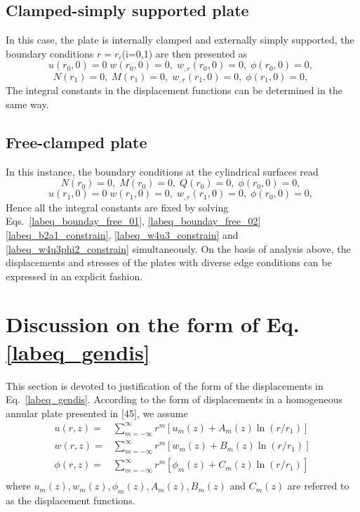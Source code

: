 \documentclass[12pt,sort&compress,fleqn,3p]{elsarticle}
\newcommand{\qiuhe}{ \sum ^{\infty}_{m=-\infty}}
\newcommand{\jiaobiao}[2]{ {#1} _ {#2} }
\begin{document}
\subsection{Clamped-simply supported plate}
In this case, the plate is internally clamped and externally simply supported, the boundary conditions $r=r_i$(i=0,1) are then presented as
\begin{equation}\label{labeq_bounday_clasim_01}
u(r_0,0)=0\; w(r_0,0)=0, \;w_{,r}(r_0,0)=0, \;  \phi(r_0,0)=0,\;
\end{equation}
\begin{equation}\label{labeq_bounday_clasim_02}
N(r_1)=0, \; M(r_1)=0, \;w_{,r}(r_1,0)=0, \;  \phi(r_1,0)=0,\;
\end{equation}
The integral constants in the displacement functions can be determined in the same way.
\subsection{Free-clamped plate}
In this instance, the boundary conditions at the cylindrical surfaces read
\begin{equation}\label{labeq_bounday_free_01}
N(r_0)=0, \; M(r_0)=0, \;Q(r_0)=0, \;  \phi(r_0,0)=0,\;
\end{equation}
\begin{equation}\label{labeq_bounday_free_02}
u(r_1,0)=0\; w(r_1,0)=0, \;w_{,r}(r_1,0)=0, \;  \phi(r_0,0)=0,\;
\end{equation}
Hence all the integral constants are fixed by solving   Eqs.~\eqref{labeq_bounday_free_01}, \eqref{labeq_bounday_free_02}      \eqref{labeq_b2a1_constrain}, \eqref{labeq_w4u3_constrain} and \eqref{labeq_w4u3phi2_constrain}  simultaneously.
On the basis of analysis above, the displacements and stresses of the plates with diverse edge conditions can be expressed in an explicit fashion.
\appendix
\renewcommand\thetable{\arabic{table}}
\renewcommand\thefigure{\arabic{figure}}
\setcounter{equation}{0}
\section{Discussion on the form of Eq.\eqref{labeq_gendis}}
This section is devoted to justification of the form of the displacements in Eq.~\eqref{labeq_gendis}.  According to the form of displacements in a homogeneous annular plate presented in [45], we assume
\begin{equation}\label{labeq_appBdis}
\begin{split}
u(r,z)=&\qiuhe r^{m} \left[\jiaobiao{u}{m}(z)+\jiaobiao{A}{m}(z) \ln(r/r_{1})\right]\\
w(r,z)=&\qiuhe r^{m} [\jiaobiao{w}{m}(z)+\jiaobiao{B}{m}(z) \ln(r/r_{1})]\\
\phi (r,z)=&\qiuhe r^{m} [\jiaobiao{\phi}{m}(z)+\jiaobiao{C}{m}(z) \ln(r/r_{1})]\\
\end{split}
\end{equation}
where $ \jiaobiao{u}{m}(z),\jiaobiao{w}{m}(z),\jiaobiao{\phi}{m}(z),\jiaobiao{A}{m}(z),\jiaobiao{B}{m}(z)  $     and  $ \jiaobiao{C}{m}(z) $ are referred to as the displacement functions.
\end{document}
